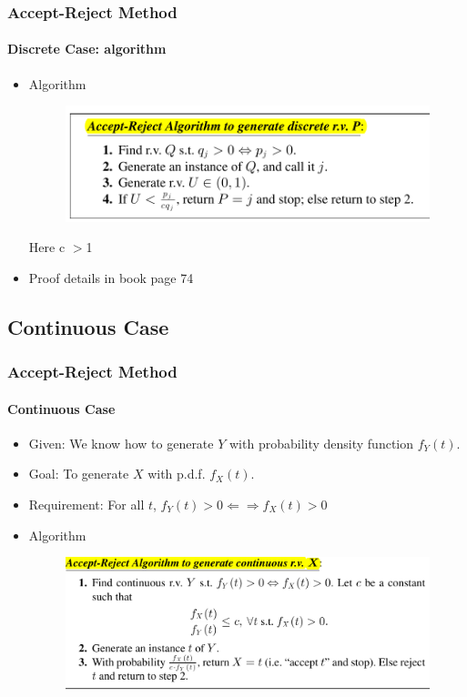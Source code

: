 \documentclass{beamer}
\begin{document}
\begin{frame}
    \frametitle{Accept-Reject Method}
    \framesubtitle{Discrete Case: algorithm  }
	\begin{itemize}
		\item Algorithm
		{
		\begin{figure}
        \begin{center}
		\includegraphics[scale=0.2]{images/accept_reject_algo.jpg}
        \end{center}
		\end{figure}
		} 
		Here c  $ > $1 
		\item Proof details in book page 74
		  
	\end{itemize}	   
    
\end{frame}
\subsection{Continuous Case}


\begin{frame}
    \frametitle{Accept-Reject Method}
    \framesubtitle{Continuous Case  }
	\begin{itemize}
	\item Given: We know how to generate $Y$ with probability density function $f_Y (t)$.
\item Goal: To generate $X$ with p.d.f. $f_X (t)$.
\item Requirement: For all $t$, $f_Y (t) > 0 \Longleftarrow\Longrightarrow f_X (t) > 0$

		\item Algorithm
		{
		\begin{figure}
        \begin{center}
		\includegraphics[scale=0.3]{images/accept_reject_cont_case_algo.jpg}
        \end{center}
		\end{figure}
		} 		  
	\end{itemize}	   
    
\end{frame}
    
\end{document}
